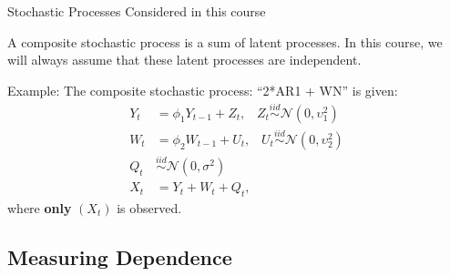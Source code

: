 \documentclass[envcountsect,usenames,dvipsnames]{beamer}
\def\simiid{\stackrel{iid}{\sim}}
\theoremstyle{mystyle}
\begin{document}
\begin{frame}{Stochastic Processes Considered in this course}
    \normalsize
    \begin{Definition}
    \label{def:composite}
    A composite stochastic process is a sum of latent processes. In this course, we will always assume that these latent processes are independent.
    \end{Definition}
    
    \begin{exampleblock}{Example:}
    The composite stochastic process: ``2*AR1 + WN'' is given:
\begin{equation*}
    \begin{aligned}
        Y_t &= \phi_1 Y_{t-1} + Z_t, \;\;\; Z_t \simiid \mathcal{N}(0,\upsilon_1^2)\\
         W_t &= \phi_2 W_{t-1} + U_t, \;\;\; U_t \simiid \mathcal{N}(0,\upsilon_2^2)\\
         Q_t &\simiid \mathcal{N}(0,\sigma^2)\\
         X_t &= Y_t + W_t + Q_t,
    \end{aligned}
\end{equation*}
%
where {\color{beamer@myorange}\textbf{only}} $(X_t)$ is observed.
    \end{exampleblock}
\end{frame}



\subsection{Measuring Dependence}
\end{document}
